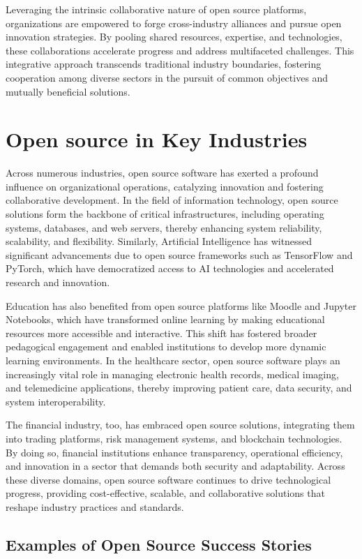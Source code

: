 Leveraging the intrinsic collaborative nature of open source platforms, organizations are empowered to forge cross-industry alliances and pursue open innovation 
strategies. By pooling shared resources, expertise, and technologies, these collaborations accelerate progress and address multifaceted challenges. 
This integrative approach transcends traditional industry boundaries, fostering cooperation among diverse sectors in the pursuit of common objectives and mutually beneficial solutions.

\section{Open source in Key Industries}
Across numerous industries, open source software has exerted a profound influence on organizational operations, catalyzing innovation and fostering collaborative development. 
In the field of information technology, open source solutions form the backbone of critical infrastructures, including operating systems, databases, and web servers, 
thereby enhancing system reliability, scalability, and flexibility. Similarly, Artificial Intelligence has witnessed significant advancements due to open source 
frameworks such as TensorFlow and PyTorch, which have democratized access to AI technologies and accelerated research and innovation.  

Education has also benefited from open source platforms like Moodle and Jupyter Notebooks, which have transformed online learning by making educational 
resources more accessible and interactive. This shift has fostered broader pedagogical engagement and enabled institutions to develop more dynamic learning environments. 
In the healthcare sector, open source software plays an increasingly vital role in managing electronic health records, medical imaging, and telemedicine applications, 
thereby improving patient care, data security, and system interoperability.  

The financial industry, too, has embraced open source solutions, integrating them into trading platforms, risk management systems, and blockchain technologies. 
By doing so, financial institutions enhance transparency, operational efficiency, and innovation in a sector that demands both security and adaptability. 
Across these diverse domains, open source software continues to drive technological progress, providing cost-effective, scalable, and collaborative solutions that reshape 
industry practices and standards.

\subsection{Examples of Open Source Success Stories}

